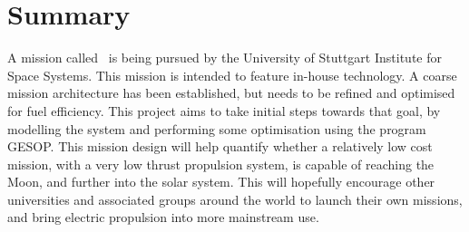 \section{Summary} \label{sec:Intro-summary}

A mission called \BW\ is being pursued by the University of Stuttgart Institute for Space Systems. This mission is intended to feature in-house technology. A coarse mission architecture has been established, but needs to be refined and optimised for fuel efficiency. This project aims to take initial steps towards that goal, by modelling the system and performing some optimisation using the program GESOP. This mission design will help quantify whether a relatively low cost mission, with a very low thrust propulsion system, is capable of reaching the Moon, and further into the solar system. This will hopefully encourage other universities and associated groups around the world to launch their own missions, and bring electric propulsion into more mainstream use.
